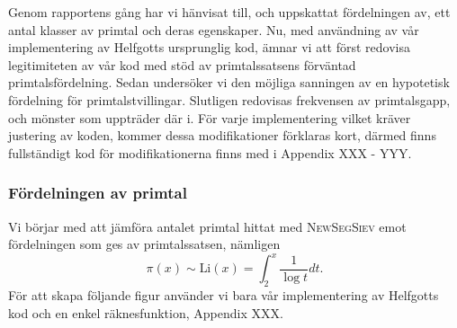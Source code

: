 
Genom rapportens gång har vi hänvisat till, och uppskattat fördelningen av, ett antal klasser av primtal och deras egenskaper. 
Nu, med användning av vår implementering av Helfgotts ursprunglig kod, ämnar vi att först redovisa legitimiteten av vår kod med stöd av primtalssatsens förväntad primtalsfördelning. 
Sedan undersöker vi den möjliga sanningen av en hypotetisk fördelning för primtalstvillingar. 
Slutligen redovisas frekvensen av primtalsgapp, och mönster som uppträder där i.
För varje implementering vilket kräver justering av koden, kommer dessa modifikationer förklaras kort, därmed finns fullständigt kod för modifikationerna finns med i Appendix XXX - YYY.

\subsubsection{Fördelningen av primtal}\label{app.primes.title}

Vi börjar med att jämföra antalet primtal hittat med \textsc{NewSegSiev} emot fördelningen som ges av primtalssatsen, nämligen
\begin{equation}
    \pi(x) \sim \text{Li}(x) = \int_2^x\frac{1}{\log t}dt\label{app.primes.PNT}.
\end{equation}
För att skapa följande figur använder vi bara vår implementering av Helfgotts kod och en enkel räknesfunktion, Appendix XXX.


